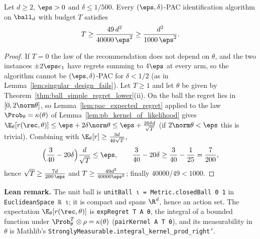 \begin{corollary}\label{cor:ball_pac_lower}
\leanok
{}
Let $d\ge2$, $\eps>0$ and $\delta\le1/500$. Every $(\eps,\delta)$-PAC identification algorithm
on $\ball_d$ with budget $T$ satisfies
\[
  T\ge\frac{49\,d^2}{40000\,\eps^2}\ge\frac{d^2}{1000\,\eps^2} .
\]
\end{corollary}

\begin{proof}
\leanok
{}
If $T = 0$ the law of the recommendation does not depend on $\theta$, and the two instances
$\pm2\eps e_1$ have regrets summing to $4\eps$ at every arm, so the algorithm cannot be
$(\eps,\delta)$-PAC for $\delta<1/2$ (as in Lemma~\ref{lem:singular_design_fails}).
Let $T\ge1$ and let $\theta$ be given by Theorem~\ref{thm:ball_simple_regret_lower}(ii). On
the ball the regret lies in $[0, 2\norm\theta]$, so Lemma~\ref{lem:pac_expected_regret}
applied to the law $\Prob_\theta = \kappa(\theta)$ of Lemma~\ref{lem:pb_kernel_of_likelihood}
gives $\E_\theta[r(\rec,\theta)]\le\eps+2\delta\norm\theta\le\eps+\frac{20\delta d}{\sqrt T}$
(if $2\norm\theta < \eps$ this is trivial). Combining
with $\E_\theta[r]\ge\frac{3d}{40\sqrt T}$,
\[
  \Big(\frac{3}{40}-20\delta\Big)\frac{d}{\sqrt T}\le\eps,\qquad
  \frac{3}{40}-20\delta\ge\frac{3}{40}-\frac{1}{25} = \frac{7}{200},
\]
hence $\sqrt T\ge\frac{7d}{200\,\eps}$ and $T\ge\frac{49d^2}{40000\eps^2}$; finally
$40000/49<1000$.
\end{proof}

\textbf{Lean remark.} The unit ball is \texttt{unitBall ι = Metric.closedBall 0 1} in
\texttt{EuclideanSpace ℝ ι}; it is compact and spans $\R^d$, hence an action set. The
expectation $\E_\theta[r(\rec,\theta)]$ is \texttt{expRegret T A θ}, the integral of a bounded
function under $\Prob_\theta^T\otimes\rho = \kappa(\theta)$ (\texttt{pairKernel A T θ}), and its
measurability in $\theta$ is Mathlib's \texttt{StronglyMeasurable.integral\_kernel\_prod\_right'}.

